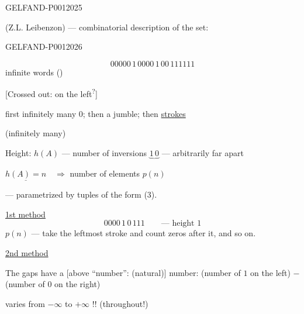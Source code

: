 \begin{GelfandAdjacentEvidence}{GELFAND-P001202}{5}

(Z.L. Leibenzon) --- combinatorial description of the set:
\end{GelfandAdjacentEvidence}
\begin{GelfandAdjacentEvidence}{GELFAND-P001202}{6}

\[
00000\,1\,0000\,1\,00\,111111
\]
infinite words ()

[Crossed out: on the left\textsuperscript{?}]
\end{GelfandAdjacentEvidence}

first infinitely many $0$; then a jumble; then \underline{strokes}

(infinitely many)

Height: $h(A)$ --- number of inversions $\underbrace{1\,0}$ --- arbitrarily far apart

$\underline{h(A)=n}\quad\Rightarrow$ number of elements $p(n)$

--- parametrized by tuples of the form (3).

\underline{1st method}
\[
0000\,1\,0\,111\qquad\text{--- height }1
\]
$p(n)$ --- take the leftmost stroke and count zeros after it, and so on.

\underline{2nd method}

The gaps have a [above “number”: (natural)] number:
(number of $1$ on the left) $-$ (number of $0$ on the right)

 varies from $-\infty$ to $+\infty$ !! (throughout!)


